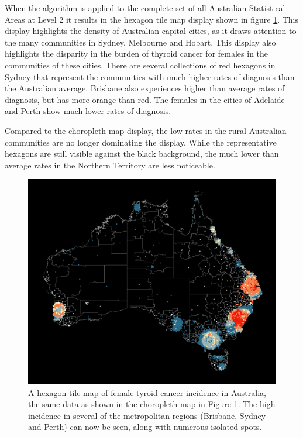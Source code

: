 When the algorithm is applied to the complete set of all Australian
Statistical Areas at Level 2 it results in the hexagon tile map display
shown in figure \ref{fig:hexmap}. This display highlights the density of
Australian capital cities, as it draws attention to the many communities
in Sydney, Melbourne and Hobart. This display also highlights the
disparity in the burden of thyroid cancer for females in the communities
of these cities. There are several collections of red hexagons in Sydney
that represent the communities with much higher rates of diagnosis than
the Australian average. Brisbane also experiences higher than average
rates of diagnosis, but has more orange than red. The females in the
cities of Adelaide and Perth show much lower rates of diagnosis.

Compared to the choropleth map display, the low rates in the rural
Australian communities are no longer dominating the display. While the
representative hexagons are still visible against the black background,
the much lower than average rates in the Northern Territory are less
noticeable.

\begin{Schunk}
\begin{figure}
\includegraphics[width=0.95\linewidth]{kobakian-cook_files/figure-latex/hexmap-1} \caption[A hexagon tile map of female tyroid cancer incidence in Australia, the same data as shown in the choropleth map in Figure 1]{A hexagon tile map of female tyroid cancer incidence in Australia, the same data as shown in the choropleth map in Figure 1. The high incidence in several of the metropolitan regions (Brisbane, Sydney and Perth) can now be seen, along with numerous isolated spots.}\label{fig:hexmap}
\end{figure}
\end{Schunk}

